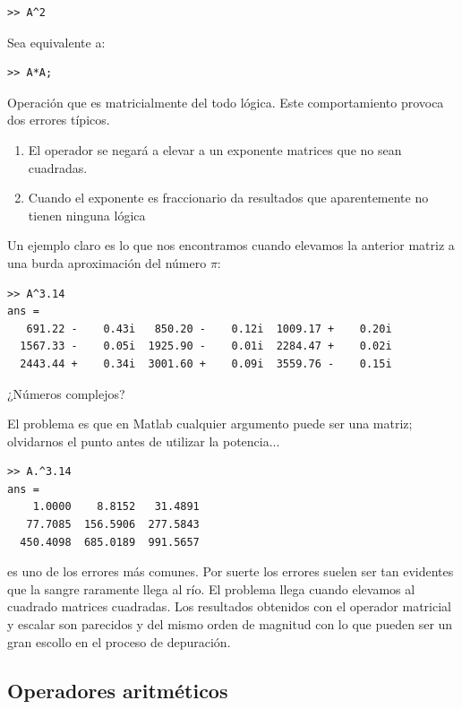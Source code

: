 \begin{verbatim}
>> A^2
\end{verbatim}
Sea equivalente a:

\begin{verbatim}
>> A*A;
\end{verbatim}

Operación que es matricialmente del todo lógica. Este comportamiento
provoca dos errores típicos.

\begin{enumerate}
\item El operador se negará a elevar a un exponente matrices que no
  sean cuadradas.
\item Cuando el exponente es fraccionario da resultados que
  aparentemente no tienen ninguna lógica
\end{enumerate}
Un ejemplo claro es lo que nos encontramos cuando elevamos la anterior
matriz a una burda aproximación del número $\pi$:

\begin{verbatim}
>> A^3.14
ans =
   691.22 -    0.43i   850.20 -    0.12i  1009.17 +    0.20i
  1567.33 -    0.05i  1925.90 -    0.01i  2284.47 +    0.02i
  2443.44 +    0.34i  3001.60 +    0.09i  3559.76 -    0.15i
\end{verbatim}
¿Números complejos?

El problema es que en Matlab cualquier argumento puede ser una matriz;
olvidarnos el punto antes de utilizar la potencia...

\begin{verbatim}
>> A.^3.14
ans =
    1.0000    8.8152   31.4891
   77.7085  156.5906  277.5843
  450.4098  685.0189  991.5657
\end{verbatim}
es uno de los errores más comunes. Por suerte los errores suelen ser
tan evidentes que la sangre raramente llega al río. El problema llega
cuando elevamos al cuadrado matrices cuadradas. Los resultados
obtenidos con el operador matricial y escalar son parecidos y del
mismo orden de magnitud con lo que pueden ser un gran escollo en el
proceso de depuración.


\subsection{Operadores aritméticos}

